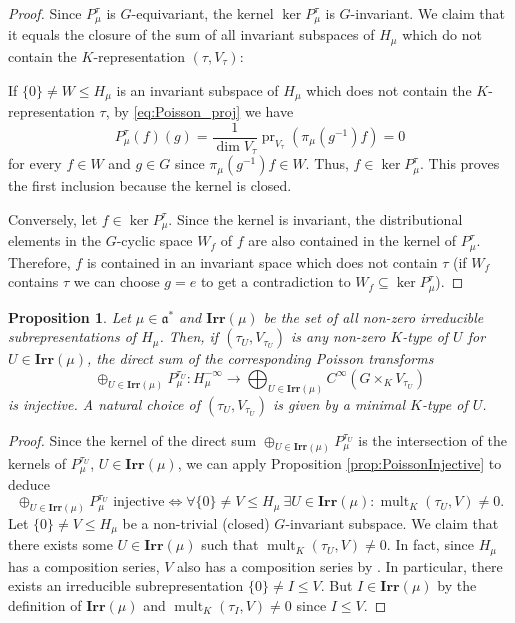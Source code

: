 \documentclass[JEP,XML,SOM,NoFloatCountersInSection,Unicode,published]{cedram}
\newtheorem{proposition}[theorem]{Proposition}
\theoremstyle{definition}
\newcommand{\mf}[1]{\ensuremath{\mathfrak{#1}}}
\newcommand{\on}[1]{\ensuremath{\operatorname{#1}}}
\newcommand{\pst}[1]{\ensuremath{H_{#1}}}
\newcommand{\pstd}[1]{\ensuremath{H_{#1}^{-\infty}}}
\begin{document}
\begin{proof}
Since $P_{\mu}^\tau$ is $G$-equivariant, the kernel $\ker P_{\mu}^\tau$ is $G$-invariant. We claim that it equals the closure of the sum of all invariant subspaces of $\pst{\mu}$ which do not contain the $K$-representation $(\tau,V_\tau)$:

If $\{0\}\neq W\leq\pst{\mu}$ is an invariant subspace of $\pst{\mu}$ which does not contain the $K$\nobreakdash-representation $\tau$, by \eqref{eq:Poisson_proj} we have\vspace*{-3pt}
\[
P_{\mu}^\tau(f)(g)=\frac{1}{\dim V_\tau}\on{pr}_{V_\tau}(\pi_\mu(g^{-1})f)=0
\]
for every $f\in W$ and $g\in G$ since $\pi_\mu(g^{-1})f\in W$. Thus, $f\in\ker P_{\mu}^\tau$. This proves the first inclusion because the kernel is closed.

Conversely, let $f\in\ker P_{\mu}^\tau$. Since the kernel is invariant, the distributional elements in the $G$-cyclic space $W_f$ of $f$ are also contained in the kernel of $P_{\mu}^\tau$. Therefore, $f$ is contained in an invariant space which does not contain $\tau$ (if $W_f$ contains $\tau$ we can choose $g=e$ to get a contradiction to $W_f\subseteq\ker P_{\mu}^\tau$).
\end{proof}

\begin{proposition}\label{prop:Poisson_sum}
Let $\mu\in\mf a^*$ and $\mathbf{Irr}(\mu)$ be the set of all non-zero irreducible subrepresentations of $\pst{\mu}$. Then, if $(\tau_U, V_{\tau_U})$ is any non-zero $K$-type of $U$ for $U\in\mathbf{Irr}(\mu)$, the direct sum of the corresponding Poisson transforms
\[
\oplus_{U\in\mathbf{Irr}(\mu)} P_\mu^{\tau_U}: \pstd{\mu}\to \bigoplus_{U\in\mathbf{Irr}(\mu)}C^\infty(G\times_KV_{\tau_U})
\]
is injective. A natural choice of $(\tau_U,V_{\tau_U})$ is given by a minimal $K$-type of $U$.
\end{proposition}
\begin{proof}
Since the kernel of the direct sum $\oplus_{U\in\mathbf{Irr}(\mu)} P_\mu^{\tau_U}$ is the intersection of the kernels of $P_\mu^{\tau_U}$, $U\in\mathbf{Irr}(\mu)$, we can apply Proposition \ref{prop:PoissonInjective} to deduce
\[
\oplus_{U\in\mathbf{Irr}(\mu)} P_\mu^{\tau_U}\text{ injective}\iff\forall \{0\}\neq V\leq \pst{\mu}\ \exists U\in\mathbf{Irr}(\mu)\colon\on{mult}_K(\tau_U,V)\neq 0.
\]
Let $\{0\}\neq V\leq \pst{\mu}$ be a non-trivial (closed) $G$-invariant subspace. We claim that there exists some $U\in\mathbf{Irr}(\mu)$ such that $\on{mult}_K(\tau_U, V)\neq0$. In fact, since $\pst{\mu}$ has a composition series, $V$ also has a composition series by \cite[p.\,815]{cohomo}. In particular, there exists an irreducible subrepresentation $\{0\}\neq I\leq V$. But $I\in\mathbf{Irr}(\mu)$ by the definition of $\mathbf{Irr}(\mu)$ and $\on{mult}_K(\tau_I,V)\neq 0$ since $I\leq V$.
\end{proof}
\end{document}
